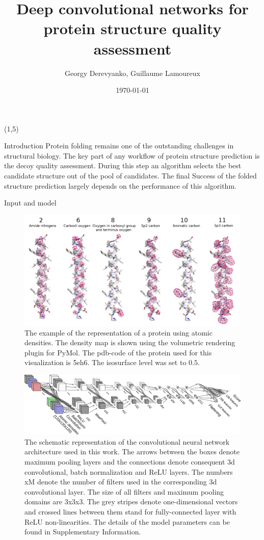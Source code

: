 \documentclass[final, unknownkeysallowed]{beamer}
\title{Deep convolutional networks for protein structure quality assessment}
\author{Georgy Derevyanko, Guillaume Lamoureux}
\institute[CLS]{Concordia University, QC, Canada}
\date{\today}
\begin{document}
\begin{frame}{}

\begin{textblock}{19.5}(1,5)
\begin{block}{Introduction}
Protein folding remains one of the outstanding challenges in structural biology. 
The key part of any workflow of protein structure prediction is the decoy quality assessment. 
During this step an algorithm selects the best candidate structure out of the pool of candidates. The final 
Success of the folded structure prediction largely depends on the performance of this algorithm.
\end{block}

\begin{block}{Input and model}

\begin{figure}[H]
    \centering
    \includegraphics[width=\linewidth]{../draft/Fig/atomic_densities_V3.png}
    \caption{The example of the representation of a protein using atomic densities. The density map is 
    shown using the volumetric rendering plugin for PyMol. The pdb-code of the protein used for this visualization is 5eh6.
    The isosurface level was set to $0.5$.}
    \label{Fig:atomic_densities}
\end{figure}

\begin{figure}[H]
    \centering
    \includegraphics[width=\linewidth]{../draft/Fig/ConvnetDiagramV1.png}
    \caption{The schematic representation of the convolutional neural network architecture used in this work. 
    The arrows between the boxes denote maximum pooling layers and the connections denote 
    consequent 3d convolutional, batch normalization and ReLU layers. The numbers xM denote the number of filters 
    used in the corresponding 3d convolutional layer. The size of all filters and 
    maximum pooling domains are 3x3x3. The grey stripes denote one-dimensional vectors and crossed lines between them 
    stand for fully-connected layer with ReLU non-linearities. The details of the model parameters can be found in 
    Supplementary Information.}
    \label{Fig:CNNModel}
\end{figure}


\end{block}
\end{textblock}
\end{frame}
\end{document}

